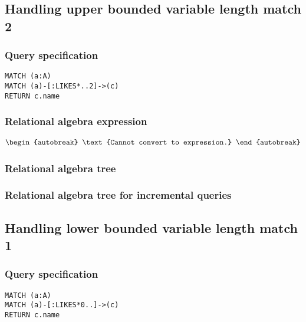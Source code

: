 
\subsection{Handling upper bounded variable length match 2}

\subsubsection*{Query specification}

\begin{lstlisting}
MATCH (a:A)
MATCH (a)-[:LIKES*..2]->(c)
RETURN c.name
\end{lstlisting}

\subsubsection*{Relational algebra expression}

\begin{align*}
\begin{autobreak}
\text{Cannot convert to expression.}
\end{autobreak}
\end{align*}

\subsubsection*{Relational algebra tree}


\subsubsection*{Relational algebra tree for incremental queries}


\subsection{Handling lower bounded variable length match 1}

\subsubsection*{Query specification}

\begin{lstlisting}
MATCH (a:A)
MATCH (a)-[:LIKES*0..]->(c)
RETURN c.name
\end{lstlisting}

